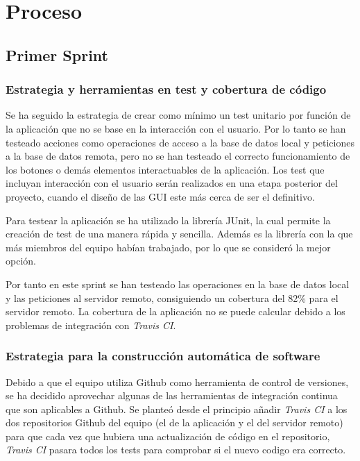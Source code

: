 \documentclass[11pt,a4paper]{report}
\begin{document}
\chapter{Proceso}
\section{Primer Sprint}
\subsection{Estrategia y herramientas en test y cobertura de código}
Se ha seguido la estrategia de crear como mínimo un test unitario por función de la aplicación que no se base en la interacción con el usuario. Por lo tanto se han testeado acciones como operaciones de acceso a la base de datos local y peticiones a la base de datos remota, pero no se han testeado el correcto funcionamiento de los botones o demás elementos interactuables de la aplicación. Los test que incluyan interacción con el usuario serán realizados en una etapa posterior del proyecto, cuando el diseño de las GUI este más cerca de ser el definitivo. %

Para testear la aplicación se ha utilizado la librería JUnit, la cual permite la creación de test de una manera rápida y sencilla. Además es la librería con la que más miembros del equipo habían trabajado, por lo que se consideró la mejor opción.

Por tanto en este sprint se han testeado las operaciones en la base de datos local y las peticiones al servidor remoto, consiguiendo un cobertura del 82\% para el servidor remoto. La cobertura de la aplicación no se puede calcular debido a los problemas de integración con \textit{Travis CI}.

\subsection{Estrategia para la construcción automática de software}
Debido a que el equipo utiliza Github como herramienta de control de versiones, se ha decidido aprovechar algunas de las herramientas de integración continua que son aplicables a Github. Se planteó desde el principio añadir \textit{Travis CI} a los dos repositorios Github del equipo (el de la aplicación y el del servidor remoto) para que cada vez que hubiera una actualización de código en el repositorio, \textit{Travis CI} pasara todos los tests para comprobar si el nuevo codigo era correcto. 
\end{document}
